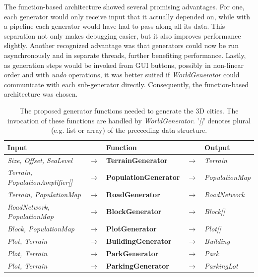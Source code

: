 The function-based architecture showed several promising advantages.
For one, each generator would only receive input that it actually depended on, while with a pipeline each generator would have had to pass along all its data.
This separation not only makes debugging easier, but it also improves performance slightly.
Another recognized advantage was that generators could now be run asynchronously and in separate threads, further benefiting performance.
Lastly, as generation steps would be invoked from GUI buttons, possibly in non-linear order and with \textit{undo} operations, it was better suited if \textit{WorldGenerator} could communicate with each sub-generator directly.
Consequently, the function-based architecture was chosen.

\begin{table}[H]
  \centering
  \begin{tabular}{lllll}
    \textbf{Input}                           &               & \textbf{Function}            &               & \textbf{Output}         \\
    \midrule
    \textit{Size, Offset, SeaLevel}          & $\rightarrow$ & \textbf{TerrainGenerator}    & $\rightarrow$ & \textit{Terrain}        \\
    \textit{Terrain, PopulationAmplifier[]}  & $\rightarrow$ & \textbf{PopulationGenerator} & $\rightarrow$ & \textit{PopulationMap}  \\
    \textit{Terrain, PopulationMap}          & $\rightarrow$ & \textbf{RoadGenerator}       & $\rightarrow$ & \textit{RoadNetwork}    \\
    \textit{RoadNetwork, PopulationMap}      & $\rightarrow$ & \textbf{BlockGenerator}      & $\rightarrow$ & \textit{Block[]}        \\
    \textit{Block, PopulationMap}            & $\rightarrow$ & \textbf{PlotGenerator}       & $\rightarrow$ & \textit{Plot[]}         \\
    \textit{Plot, Terrain}                   & $\rightarrow$ & \textbf{BuildingGenerator}   & $\rightarrow$ & \textit{Building}       \\
    \textit{Plot, Terrain}                   & $\rightarrow$ & \textbf{ParkGenerator}       & $\rightarrow$ & \textit{Park}           \\
    \textit{Plot, Terrain}                   & $\rightarrow$ & \textbf{ParkingGenerator}    & $\rightarrow$ & \textit{ParkingLot}     \\
    \bottomrule
  \end{tabular}

  \caption[]{The proposed generator functions needed to generate the 3D cities. The invocation of these functions are handled by \textit{WorldGenerator}. '\textit{[]}' denotes plural (e.g. list or array) of the preceeding data structure.}
  \label{table:generators}
\end{table}
\vspace{-0.4cm} %

